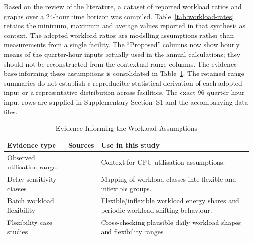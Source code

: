 \documentclass[lettersize,journal]{IEEEtran}
\begin{document}
Based on the review of the literature, a dataset of reported workload ratios and graphs over a 24-hour time horizon was compiled. Table~\ref{tab:workload-rates} retains the minimum, maximum and average values reported in that synthesis as context. The adopted workload ratios are modelling assumptions rather than measurements from a single facility. The ``Proposed'' columns now show hourly means of the quarter-hour inputs actually used in the annual calculations; they should not be reconstructed from the contextual range columns. The evidence base informing these assumptions is consolidated in Table~\ref{tab:workload-source-summary}. The retained range summaries do not establish a reproducible statistical derivation of each adopted input or a representative distribution across facilities. The exact 96 quarter-hour input rows are supplied in Supplementary Section~S1 and the accompanying data files.

\begin{table}[!t]
\centering
\caption{Evidence Informing the Workload Assumptions}
\label{tab:workload-source-summary}
\begin{scriptsize}
%
\begin{tabular}{p{}p{}p{}}
\toprule
\textbf{Evidence type} & \textbf{Sources} & \textbf{Use in this study} \\
\midrule
Observed utilisation ranges & \cite{Zaloumis2022IBM,Ghia2011McKinsey} & Context for CPU utilisation assumptions. \\
Delay-sensitivity classes & \cite{6779441} & Mapping of workload classes into flexible and inflexible groups. \\
Batch workload flexibility & \cite{Cao2022ApEn} & Flexible/inflexible workload energy shares and periodic workload shifting behaviour. \\
Flexibility case studies & \cite{Misaghian2023TIA,Xu2023SPIE,Zhou2024IJEPES,Fu2020ApEn,Liu2012PER} & Cross-checking plausible daily workload shapes and flexibility ranges. \\
\bottomrule
\end{tabular}%
\end{scriptsize}
\end{table}
\end{document}
